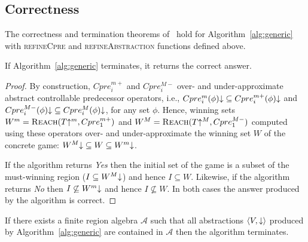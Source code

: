\subsection{Correctness}

The correctness and termination theorems of~\cite{Alfaro_Roy_07} hold for Algorithm~\ref{alg:generic} with \textsc{refineCpre} and \textsc{refineAbstraction} functions defined above.

\begin{theorem}

If Algorithm~\ref{alg:generic} terminates, it returns the correct answer.

\end{theorem}

\begin{proof}

By construction, $Cpre_i^{m+}$ and $Cpre_i^{M-}$ over- and under-approximate abstract controllable predecessor operators, i.e., $Cpre_i^m(\phi)\mathord{\downarrow} \subseteq Cpre_i^{m+}(\phi)\mathord{\downarrow}$ and $Cpre_i^{M-}(\phi)\mathord{\downarrow} \subseteq Cpre_i^M(\phi)\mathord{\downarrow}$, for any set $\phi$.  Hence, winning sets $W^m = \textsc{Reach}(T\mathord{\uparrow^m}, Cpre_1^{m+})$ and $W^M = \textsc{Reach}(T\mathord{\uparrow^M}, Cpre_1^{M-})$ computed using these operators over- and under-approximate the winning set $W$ of the concrete game: $W^M\mathord{\downarrow}\subseteq W \subseteq W^m\mathord{\downarrow}$.  

If the algorithm returns \emph{Yes} then the initial set of the game is a subset of the must-winning region ($I\subseteq W^M\mathord{\downarrow}$) and hence $I\subseteq W$.  Likewise, if the algorithm returns \emph{No} then $I\not\subseteq W^m\mathord{\downarrow}$ and hence $I\not\subseteq W$.  In both cases the answer produced by the algorithm is correct.

\end{proof}

\begin{theorem}
\label{t:termination}

If there exists a finite region algebra $\mathcal{A}$ such that all abstractions $\langle V, \mathord{\downarrow}\rangle$ produced by Algorithm~\ref{alg:generic} are contained in $\mathcal{A}$ then the algorithm terminates.

\end{theorem}

